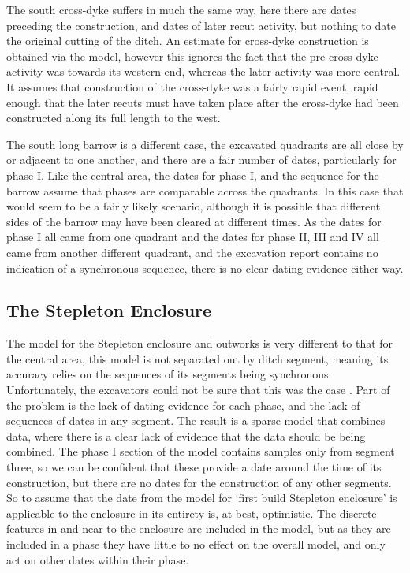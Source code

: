 The south cross-dyke suffers in much the same way, here there are dates preceding the construction, and dates of later recut activity, but nothing to date the original cutting of the ditch. An estimate for cross-dyke construction is obtained via the model, however this ignores the fact that the pre cross-dyke activity was towards its western end, whereas the later activity was more central. It assumes that construction of the cross-dyke was a fairly rapid event, rapid enough that the later recuts must have taken place after the cross-dyke had been constructed along its full length to the west. 

The south long barrow is a different case, the excavated quadrants are all close by or adjacent to one another, and there are a fair number of dates, particularly for phase I. Like the central area, the dates for phase I, and the sequence for the barrow assume that phases are comparable across the quadrants. In this case that would seem to be a fairly likely scenario, although it is possible that different sides of the barrow may have been cleared at different times. As the dates for phase I all came from one quadrant and the dates for phase II, III and IV all came from another different quadrant, and the excavation report contains no indication of a synchronous sequence, there is no clear dating evidence either way. 

\subsection{The Stepleton Enclosure}
The model for the Stepleton enclosure and outworks is very different to that for the central area, this model is not separated out by ditch segment, meaning its accuracy relies on the sequences of its segments being synchronous. Unfortunately, the excavators could not be sure that this was the case \cite[394]{Mercer:2008fk}. Part of the problem is the lack of dating evidence for each phase, and the lack of sequences of dates in any segment. The result is a sparse model that combines data, where there is a clear lack of evidence that the data should be being combined. The phase I section of the model contains samples only from segment three, so we can be confident that these provide a date around the time of its construction, but there are no dates for the construction of any other segments. So to assume that the date from the model for `first build Stepleton enclosure' is applicable to the enclosure in its entirety is, at best, optimistic. The discrete features in and near to the enclosure are included in the model, but as they are included in a phase they have little to no effect on the overall model, and only act on other dates within their phase. 

